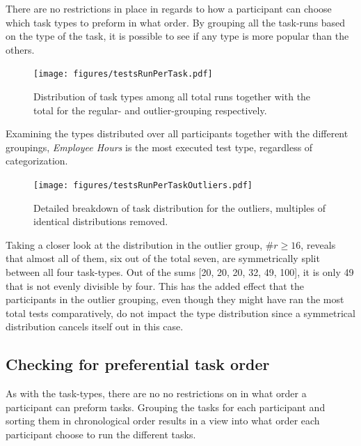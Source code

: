 \documentclass[nofilelist,dvipsnames]{cslthse-msc}
\begin{document}
        There are no restrictions in place in regards to how a participant
        can choose which task types to preform in what order. By grouping all
        the task-runs based on the type of the task, it is possible to see if
        any type is more popular than the others.

				\begin{figure}[h!]
					\centering
					\texttt{[image: figures/testsRunPerTask.pdf]}
          \caption{
            Distribution of task types among all total runs together with the
            total for the regular- and outlier-grouping respectively.
          }
				\end{figure}

        Examining the types distributed over all participants together
        with the different groupings, \textit{Employee Hours} is the most
        executed test type, regardless of categorization.

				\begin{figure}[h!]
					\centering
					\texttt{[image: figures/testsRunPerTaskOutliers.pdf]}
          \caption{
            Detailed breakdown of task distribution for the outliers, multiples
            of identical distributions removed.
          }
          \label{label_testsRunPerTaskOutliers}
				\end{figure}

        Taking a closer look at the distribution in the outlier group,
        $\#r\geq16$, reveals that almost all of them, six out of the total seven,
        are symmetrically split between all four task-types. Out of the sums
        [20, 20, 20, 32, 49, 100], it is only 49 that is not evenly divisible
        by four. This has the added effect that the participants in the
        outlier grouping, even though they might have ran the most total tests
        comparatively, do not impact the type distribution since a symmetrical
        distribution cancels itself out in this case.

      \subsection{Checking for preferential task order}

        As with the task-types, there are no no restrictions on in what order a
        participant can preform tasks. Grouping the tasks for each participant
        and sorting them in chronological order results in a view into what
        order each participant choose to run the different tasks.
\end{document}
